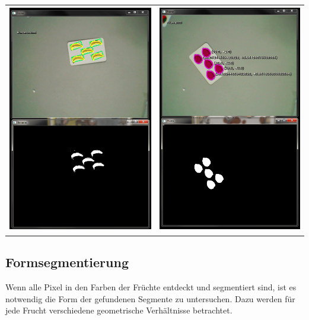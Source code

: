 \begin{center}
\begin{tabular}{cc}
\includegraphics[height=10cm]{Abbildungen/Bananen01} & \includegraphics[height=10cm]{Abbildungen/Pflaume01} \\ 
\end{tabular}

\end{center}

\subsection{Formsegmentierung}

Wenn alle Pixel in den Farben der Früchte entdeckt und segmentiert sind, ist es notwendig die Form der gefundenen Segmente zu untersuchen. Dazu werden für jede Frucht verschiedene geometrische Verhältnisse betrachtet.

